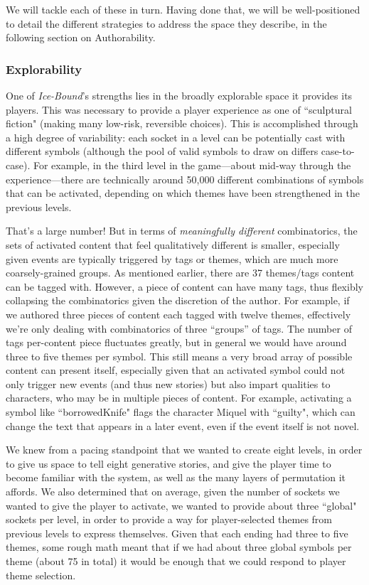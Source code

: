 We will tackle each of these in turn. Having done that, we will be well-positioned to detail the different strategies to address the space they describe, in the following section on Authorability.



\subsubsection{Explorability}\label{subsubsec:icebound-explorability}

One of \textit{Ice-Bound}'s strengths lies in the broadly explorable space it provides its players. This was necessary to provide a player experience as one of ``sculptural fiction" (making many low-risk, reversible choices). This is accomplished through a high degree of variability: each socket in a level can be potentially cast with different symbols (although the pool of valid symbols to draw on differs case-to-case). For example, in the third level in the game---about mid-way through the experience---there are technically around 50,000 different combinations of symbols that can be activated, depending on which themes have been strengthened in the previous levels.

That's a large number! But in terms of \textit{meaningfully different} combinatorics, the sets of activated content that feel qualitatively different is smaller, especially given events are typically triggered by tags or themes, which are much more coarsely-grained groups. As mentioned earlier, there are 37 themes/tags content can be tagged with. However, a piece of content can have many tags, thus flexibly collapsing the combinatorics given the discretion of the author. For example, if we authored three pieces of content each tagged with twelve themes, effectively we’re only dealing with combinatorics of three “groups” of tags.  The number of tags per-content piece fluctuates greatly, but in general we would have around three to five themes per symbol. This still means a very broad array of possible content can present itself, especially given that an activated symbol could not only trigger new events (and thus new stories) but also impart qualities to characters, who may be in multiple pieces of content. For example, activating a symbol like ``borrowedKnife" flags the character Miquel with ``guilty", which can change the text that appears in a later event, even if the event itself is not novel.

We knew from a pacing standpoint that we wanted to create eight levels, in order to give us space to tell eight generative stories, and give the player time to become familiar with the system, as well as the many layers of permutation it affords. We also determined that on average, given the number of sockets we wanted to give the player to activate, we wanted to provide about three ``global" sockets per level, in order to provide a way for player-selected themes from previous levels to express themselves. Given that each ending had three to five themes, some rough math meant that if we had about three global symbols per theme (about 75 in total) it would be enough that we could respond to player theme selection.

